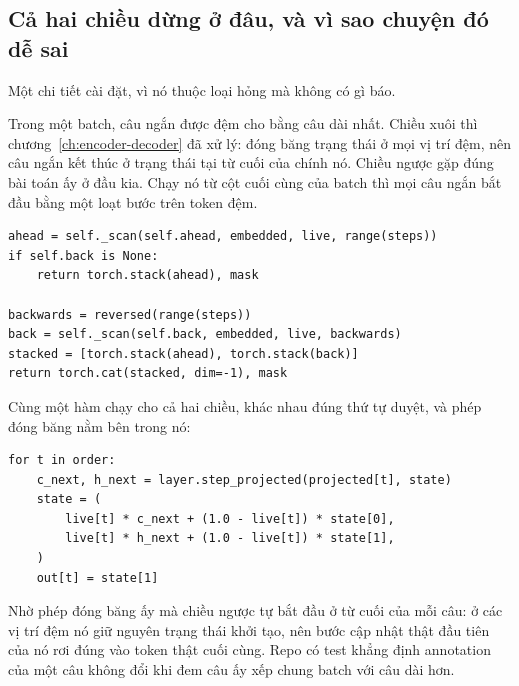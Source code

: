 \subsection*{Cả hai chiều dừng ở đâu, và vì sao chuyện đó dễ sai}

%
Một chi tiết cài đặt, vì nó thuộc loại hỏng mà không có gì báo.

Trong một batch, câu ngắn được đệm cho bằng câu dài nhất. Chiều xuôi thì
chương~\ref{ch:encoder-decoder} đã xử lý: đóng băng trạng thái ở mọi vị trí
đệm, nên câu ngắn kết thúc ở trạng thái tại từ cuối của chính nó. Chiều ngược
gặp đúng bài toán ấy ở đầu kia. Chạy nó từ cột cuối cùng của batch thì mọi câu
ngắn bắt đầu bằng một loạt bước trên token đệm.

\begin{verbatim}
ahead = self._scan(self.ahead, embedded, live, range(steps))
if self.back is None:
    return torch.stack(ahead), mask

backwards = reversed(range(steps))
back = self._scan(self.back, embedded, live, backwards)
stacked = [torch.stack(ahead), torch.stack(back)]
return torch.cat(stacked, dim=-1), mask
\end{verbatim}

Cùng một hàm  chạy cho cả hai chiều, khác nhau đúng thứ tự duyệt,
và phép đóng băng nằm bên trong nó:

\begin{verbatim}
for t in order:
    c_next, h_next = layer.step_projected(projected[t], state)
    state = (
        live[t] * c_next + (1.0 - live[t]) * state[0],
        live[t] * h_next + (1.0 - live[t]) * state[1],
    )
    out[t] = state[1]
\end{verbatim}

Nhờ phép đóng băng ấy mà chiều ngược tự bắt đầu ở từ cuối của mỗi câu: ở các
vị trí đệm nó giữ nguyên trạng thái khởi tạo, nên bước cập nhật thật đầu tiên
của nó rơi đúng vào token thật cuối cùng. Repo có test khẳng định annotation
của một câu không đổi khi đem câu ấy xếp chung batch với câu dài hơn.
